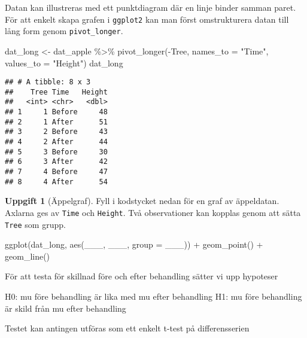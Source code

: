 \documentclass[
]{book}
\newenvironment{Shaded}{\begin{snugshade}}{\end{snugshade}}
\newcommand{\AttributeTok}[1]{\textcolor[rgb]{0.77,0.63,0.00}{#1}}
\newcommand{\FunctionTok}[1]{\textcolor[rgb]{0.00,0.00,0.00}{#1}}
\newcommand{\NormalTok}[1]{#1}
\newcommand{\OtherTok}[1]{\textcolor[rgb]{0.56,0.35,0.01}{#1}}
\newcommand{\SpecialCharTok}[1]{\textcolor[rgb]{0.00,0.00,0.00}{#1}}
\newcommand{\StringTok}[1]{\textcolor[rgb]{0.31,0.60,0.02}{#1}}
\theoremstyle{definition}
\theoremstyle{definition}
\theoremstyle{definition}
\newtheorem{exercise}{Uppgift}[chapter]
\theoremstyle{definition}
\theoremstyle{remark}
\begin{document}
Datan kan illustreras med ett punktdiagram där en linje binder samman paret. För att enkelt skapa grafen i \texttt{ggplot2} kan man först omstrukturera datan till lång form genom \texttt{pivot\_longer}.

\begin{Shaded}
\begin{Highlighting}[]
\NormalTok{dat\_long }\OtherTok{\textless{}{-}}\NormalTok{ dat\_apple }\SpecialCharTok{\%\textgreater{}\%} \FunctionTok{pivot\_longer}\NormalTok{(}\SpecialCharTok{{-}}\NormalTok{Tree, }\AttributeTok{names\_to =} \StringTok{"Time"}\NormalTok{, }\AttributeTok{values\_to =} \StringTok{"Height"}\NormalTok{)}
\NormalTok{dat\_long}
\end{Highlighting}
\end{Shaded}

\begin{verbatim}
## # A tibble: 8 x 3
##    Tree Time   Height
##   <int> <chr>   <dbl>
## 1     1 Before     48
## 2     1 After      51
## 3     2 Before     43
## 4     2 After      44
## 5     3 Before     30
## 6     3 After      42
## 7     4 Before     47
## 8     4 After      54
\end{verbatim}

\begin{exercise}[Äppelgraf]

Fyll i kodstycket nedan för en graf av äppeldatan. Axlarna ges av \texttt{Time} och \texttt{Height}. Två observationer kan kopplas genom att sätta \texttt{Tree} som grupp.

\begin{Shaded}
\begin{Highlighting}[]
\FunctionTok{ggplot}\NormalTok{(dat\_long, }\FunctionTok{aes}\NormalTok{(\_\_\_, \_\_\_, }\AttributeTok{group =}\NormalTok{ \_\_\_)) }\SpecialCharTok{+}
  \FunctionTok{geom\_point}\NormalTok{() }\SpecialCharTok{+}
  \FunctionTok{geom\_line}\NormalTok{()}
\end{Highlighting}
\end{Shaded}

\end{exercise}

För att testa för skillnad före och efter behandling sätter vi upp hypoteser

H0: mu före behandling är lika med mu efter behandling
H1: mu före behandling är skild från mu efter behandling

Testet kan antingen utföras som ett enkelt t-test på differensserien

\begin{Shaded}
\end{Shaded}
\end{document}
